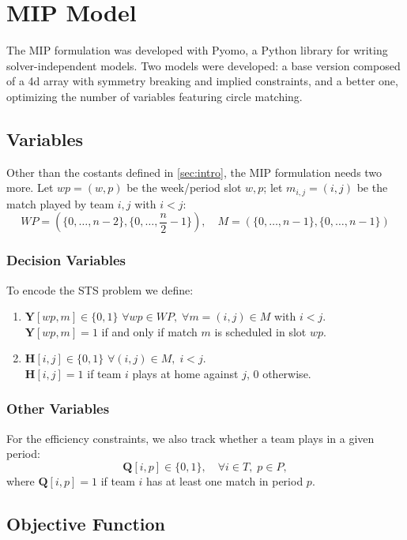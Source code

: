

\section{MIP Model}
The MIP formulation was developed with Pyomo, a Python library for writing solver-independent models.
Two models were developed: a base version composed of a 4d array with symmetry breaking and implied constraints, and a better one, optimizing the number of variables featuring circle matching.

\subsection{Variables}
Other than the costants defined in \ref{sec:intro}, the MIP formulation needs two more.
Let $wp = (w,p)$ be the week/period slot $w,p$;
let $m_{i,j} = (i,j)$ be the match played by team $i,j$ with $i<j$:
\[
WP = (\{0, \dots, n-2\},\{0, \dots, \frac{n}{2} - 1\}), \quad M = (\{0, \dots, n-1\},\{0, \dots, n-1\})
\]

\subsubsection*{Decision Variables}
To encode the STS problem we define:
\begin{enumerate}
    \item $\mathbf{Y}[wp,m] \in \{0,1\}$ \quad $\forall wp \in WP, \; \forall m=(i,j) \in M$ with $i<j$. \\
    $\mathbf{Y}[wp,m] = 1$ if and only if match $m$ is scheduled in slot $wp$.
    \item $\mathbf{H}[i,j] \in \{0,1\}$ \quad $\forall (i,j) \in M, \; i<j$. \\
    $\mathbf{H}[i,j] = 1$ if team $i$ plays at home against $j$, $0$ otherwise.
\end{enumerate}

\subsubsection*{Other Variables}
For the efficiency constraints, we also track whether a team plays in a given period:
\[
\mathbf{Q}[i,p] \in \{0,1\}, \quad \forall i \in T, \; p \in P,
\]
where $\mathbf{Q}[i,p] = 1$ if team $i$ has at least one match in period $p$.

\subsection{Objective Function}
